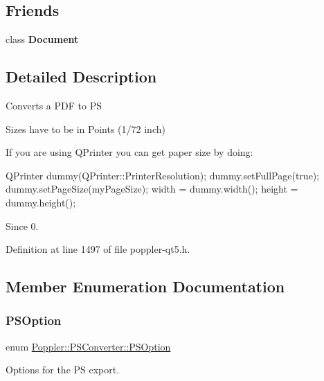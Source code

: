 \subsection*{Friends}
\begin{DoxyCompactItemize}
\item 
\mbox{\label{class_poppler_1_1_p_s_converter_a883538034e58fc5c0de7d4e4cab3cef7}} 
class {\bfseries Document}
\end{DoxyCompactItemize}


\subsection{Detailed Description}
Converts a P\+DF to PS

Sizes have to be in Points (1/72 inch)

If you are using Q\+Printer you can get paper size by doing\+: 
\begin{DoxyCode}
QPrinter dummy(QPrinter::PrinterResolution);
dummy.setFullPage(\textcolor{keyword}{true});
dummy.setPageSize(myPageSize);
width = dummy.width();
height = dummy.height();
\end{DoxyCode}


\begin{DoxySince}{Since}
0. 
\end{DoxySince}


Definition at line 1497 of file poppler-\/qt5.\+h.



\subsection{Member Enumeration Documentation}
\mbox{\label{class_poppler_1_1_p_s_converter_a3577a2109eceaf783ce4b0c51cd5c5b3}} 
\subsubsection{\texorpdfstring{P\+S\+Option}{PSOption}}
{\footnotesize\ttfamily enum \hyperlink{class_poppler_1_1_p_s_converter_a3577a2109eceaf783ce4b0c51cd5c5b3}{Poppler\+::\+P\+S\+Converter\+::\+P\+S\+Option}}

Options for the PS export.

